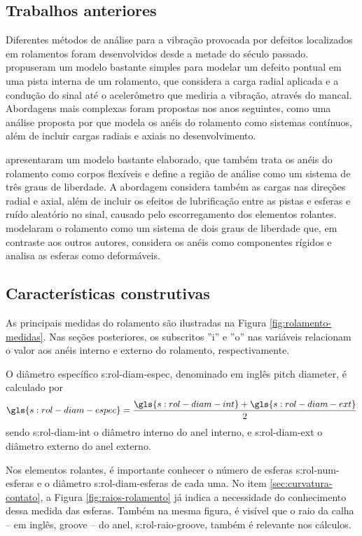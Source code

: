 \documentclass[12pt,oneside,english,brazil,lmodern,siglas,simbolos,cite=num]{ucsmonograph}
\begin{document}
	\subsection{Trabalhos anteriores}
	Diferentes métodos de análise para a vibração provocada por defeitos localizados em rolamentos foram desenvolvidos desde a metade do século passado.
	\citeauthor{mcfadden:1984} propuseram um modelo bastante simples para modelar um defeito pontual em uma pista interna de um rolamento, que considera a carga radial aplicada e a condução do sinal até o acelerômetro que mediria a vibração, através do mancal.
	Abordagens mais complexas foram propostas nos anos seguintes, como uma análise proposta por \citeauthor{tandon:1997} que modela os anéis do rolamento como sistemas contínuos, além de incluir cargas radiais e axiais no desenvolvimento.
	
	\citeauthor{sassi:2007} apresentaram um modelo bastante elaborado, que também trata os anéis do rolamento como corpos flexíveis e define a região de análise como um sistema de três graus de liberdade.
	A abordagem considera também as cargas nas direções radial e axial, além de incluir os efeitos de lubrificação entre as pistas e esferas e ruído aleatório no sinal, causado pelo escorregamento dos elementos rolantes.	\citeauthor{patil:2010} modelaram o rolamento como um sistema de dois graus de liberdade que, em contraste aos outros autores, considera os anéis como componentes rígidos e analisa as esferas como deformáveis.
		
	\subsection{Características construtivas}
	As principais medidas do rolamento são ilustradas na Figura \ref{fig:rolamento-medidas}.
	Nas seções posteriores, os subscritos ''i'' e ''o'' nas variáveis relacionam o valor aos anéis interno e externo do rolamento, respectivamente.
	
	O diâmetro específico \gls{s:rol-diam-espec}, denominado em inglês \foreignlanguage{english}{pitch diameter}, é calculado por
	\begin{equation} \label{eqn:rol:diam-espec}
		\gls{s:rol-diam-espec} = \frac{\gls{s:rol-diam-int} + 
		\gls{s:rol-diam-ext}}{2}
	\end{equation}
	sendo \gls{s:rol-diam-int} o diâmetro interno do anel interno, e \gls{s:rol-diam-ext} o diâmetro externo do anel externo.
	
	Nos elementos rolantes, é importante conhecer o número de esferas \gls{s:rol-num-esferas} e o diâmetro \gls{s:rol-diam-esferas} de cada uma.
	No item \ref{sec:curvatura-contato}, a Figura \ref{fig:raios-rolamento} já indica a necessidade do conhecimento dessa medida das esferas.	
	Também na mesma figura, é visível que o raio da calha -- em inglês, \foreignlanguage{english}{groove} -- do anel, \gls{s:rol-raio-groove}, também é relevante nos cálculos.
	
\end{document}
